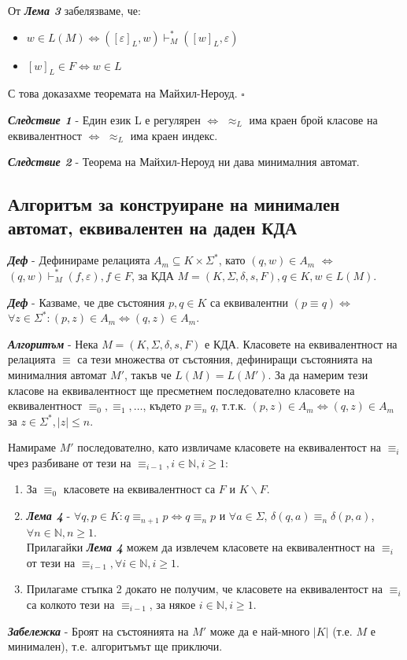 \documentclass[fleqn,12pt]{article}
\begin{document}
\begin{flushleft}
От \textit{\textbf{Лема 3}} забелязваме, че:
\begin{itemize}
    \item $w \in L(M) \iff ([\varepsilon]_L, w) \vdash_M^* ([w]_L, \varepsilon)$
    \item $[w]_L \in F \iff w \in L$
\end{itemize}

С това доказахме теоремата на Майхил-Нероуд. $\square$

\textit{\textbf{Следствие 1}} - Един език L е регулярен $\iff$ $\approx_L$ има краен брой класове на еквивалентност $\iff$ $\approx_L$ има краен индекс.

\textit{\textbf{Следствие 2}} - Теорема на Майхил-Нероуд ни дава минималния автомат.

\subsection{Алгоритъм за конструиране на минимален автомат, еквивалентен на даден КДА}

\textit{\textbf{Деф}} - Дефинираме релацията $A_m \subseteq K \times \Sigma^*$, като $(q, w) \in A_m$ $\iff$ $(q, w) \vdash_M^* (f, \varepsilon), f \in F$, за КДА $M = (K, \Sigma, \delta, s, F), q \in K, w \in L(M)$.

\textit{\textbf{Деф}} - Казваме, че две състояния $p, q \in K$ са еквивалентни $(p \equiv q) \iff$ $\forall z \in \Sigma^*: (p, z) \in A_m \iff (q, z) \in A_m$.

\textit{\textbf{Алгоритъм}} - Нека $M = (K, \Sigma, \delta, s, F)$ е КДА. Класовете на еквивалентност на релацията $\equiv$ са тези множества от състояния, дефиниращи състоянията на минималния автомат $M'$, такъв че $L(M) = L(M')$. За да намерим тези класове на еквивалентност ще пресметнем последователно класовете на еквивалентност $\equiv_0, \equiv_1, \dots$, където $p \equiv_n q$, т.т.к. $(p, z) \in A_m \iff (q, z) \in A_m$ за $z \in \Sigma^*, |z| \leq n$.

Намираме $M'$ последователно, като извличаме класовете на еквивалентост на $\equiv_i$ чрез разбиване от тези на $\equiv_{i-1}, i \in \mathbb{N}, i \geq 1$:
\begin{enumerate}
    \item За $\equiv_0$ класовете на еквивалентност са $F$ и $K \backslash F$.
    \item \textit{\textbf{Лема 4}} -  $\forall q, p \in K: q \equiv_{n+1} p \iff q \equiv_n p$ и $\forall a \in \Sigma$, $\delta(q, a) \equiv_n \delta(p, a)$, $\forall n \in \mathbb{N}, n \geq 1$. \\
    Прилагайки \textit{\textbf{Лема 4}} можем да извлечем класовете на еквивалентност на $\equiv_i$ от тези на $\equiv_{i-1}, \forall i \in \mathbb{N}, i \geq 1$.
    \item Прилагаме стъпка 2 докато не получим, че класовете на еквивалентост на $\equiv_i$ са колкото тези на $\equiv_{i-1}$, за някое $i \in \mathbb{N}, i \geq 1$.
\end{enumerate}

\textit{\textbf{Забележка}} - Броят на състоянията на $M'$ може да е най-много $|K|$ (т.е. $M$ е минимален), т.е. алгоритъмът ще приключи.

\end{flushleft}
\end{document}
